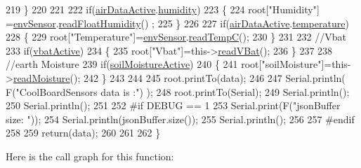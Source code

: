 \begin{DoxyCode}
219     \}
220     
221         
222     \textcolor{keywordflow}{if}(\hyperlink{class_cool_board_sensors_abff8dfeccb2f7689847bb64d5f1cd31e}{airDataActive}.\hyperlink{struct_cool_board_sensors_1_1air_active_ab69738e9fd1c2ba80dc666bcd1e116f7}{humidity}) 
223     \{   
224         root[\textcolor{stringliteral}{"Humidity"}] =\hyperlink{class_cool_board_sensors_a868e38985e9a2412829fa2790ca13e2e}{envSensor}.\hyperlink{class_b_m_e280_a42ea7232039eebf5aadb391ef6132c35}{readFloatHumidity}() ;
225     \}   
226     
227     \textcolor{keywordflow}{if}(\hyperlink{class_cool_board_sensors_abff8dfeccb2f7689847bb64d5f1cd31e}{airDataActive}.\hyperlink{struct_cool_board_sensors_1_1air_active_ac08576736c7ac3bfbfec32e5ee17c686}{temperature})
228     \{
229         root[\textcolor{stringliteral}{"Temperature"}]=\hyperlink{class_cool_board_sensors_a868e38985e9a2412829fa2790ca13e2e}{envSensor}.\hyperlink{class_b_m_e280_afffdd1d7ded9e1f92200e70669019d97}{readTempC}();
230     \}
231     
232     \textcolor{comment}{//Vbat}
233     \textcolor{keywordflow}{if}(\hyperlink{class_cool_board_sensors_ab0b4bbae83796b52b90f91008d383583}{vbatActive})    
234     \{   
235         root[\textcolor{stringliteral}{"Vbat"}]=this->\hyperlink{class_cool_board_sensors_a6944b6ea7bce8e2fce1b434acfd9d5f3}{readVBat}();
236     \}
237     
238     \textcolor{comment}{//earth Moisture}
239     \textcolor{keywordflow}{if}(\hyperlink{class_cool_board_sensors_ae7971bf527781ac4994309591b78ab89}{soilMoistureActive})
240     \{   
241         root[\textcolor{stringliteral}{"soilMoisture"}]=this->\hyperlink{class_cool_board_sensors_a8761bff50373c485f4465c8db47d0633}{readMoisture}();
242     \}
243     
244     
245     root.printTo(data);
246 
247     Serial.println( F(\textcolor{stringliteral}{"CoolBoardSensors data is :"}) );
248     root.printTo(Serial);
249     Serial.println();
250     Serial.println();
251 
252 \textcolor{preprocessor}{#if DEBUG == 1}
253     Serial.print(F(\textcolor{stringliteral}{"jsonBuffer size: "}));
254     Serial.println(jsonBuffer.size());
255     Serial.println();
256 
257 \textcolor{preprocessor}{#endif}
258 
259     \textcolor{keywordflow}{return}(data);   
260     
261 
262 \}
\end{DoxyCode}
Here is the call graph for this function\+:\nopagebreak
